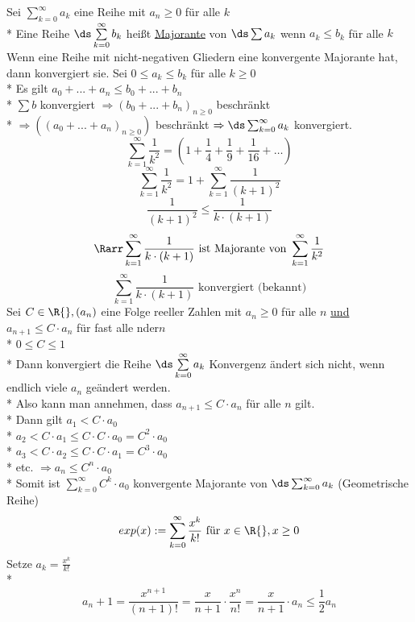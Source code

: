 \sSDef
Sei $\displaystyle\sum\limits_{k=0}^{\infty} a_k$ eine Reihe mit $a_n \geq 0$ für alle $k$\\*
Eine Reihe $\ds\sum\limits_{k=0}^{\infty} b_k$ heißt \ul{Majorante} von $\ds\sum a_k$ wenn $a_k \leq b_k$ für alle $k$
Wenn eine Reihe mit nicht-negativen Gliedern eine konvergente Majorante hat, dann konvergiert sie.
\bew
Sei $0 \leq a_k \leq b_k$ für alle $k \geq 0$\\*
Es gilt $a_0 + ... + a_n \leq b_0 + ... + b_n$ \\*
$\sum b$ konvergiert $\Rightarrow (b_0 + ... + b_n)_{n \geq 0}$  beschränkt\\*
$\Rightarrow ((a_0 + ... + a_n)_{n \geq 0})$ beschränkt $\Rightarrow \ds\sum_{k= 0}^{\infty} a_k$ konvergiert.
$$\sum\limits_{k=1}^{\infty} \frac{1}{k^2} = \left( 1 + \frac{1}{4} + \frac{1}{9}+ \frac{1}{16} + … \right)$$
$$\sum\limits_{k=1}^{\infty} \frac{1}{k^2} = 1 + \sum\limits_{k=1}^{\infty} \frac{1}{(k + 1)^2}$$
$$\frac{1}{(k + 1)^2} \leq \frac{1}{k \cdot (k + 1)}$$
$$\Rarr \sum\limits_{k=1}^{\infty} \frac{1}{k \cdot (k + 1)}\text{ ist Majorante von }\sum\limits_{k=1}^{\infty} \frac{1}{k^2}$$
$$\sum\limits_{k=1}^{\infty} \frac{1}{k \cdot (k + 1)}\text{ konvergiert (bekannt)}$$
Sei $C \in \R{}, (a_n)$ eine Folge reeller Zahlen mit $a_n \geq 0$ für alle $n$ \ul{und} $a_{n + 1} \leq C \cdot a_n$ für fast alle nder$n$\\*
$0 \leq C \leq 1$\\*
Dann konvergiert die Reihe $\ds\sum\limits_{k=0}^{\infty} a_k$
\bew
Konvergenz ändert sich nicht, wenn endlich viele $a_n$ geändert werden.\\*
Also kann man annehmen, dass $a_{n + 1} \leq C \cdot a_n$ für alle $n$ gilt.\\*
Dann gilt $a_1 < C \cdot a_0$\\*
$a_2 < C \cdot a_1 \leq C \cdot C \cdot a_0 = C^2 \cdot a_0$\\*
$a_3 < C \cdot a_2 \leq C \cdot C \cdot a_1 = C^3 \cdot a_0$\\*
etc. $\Rightarrow a_n \leq C^n \cdot a_0$\\*
Somit ist $\displaystyle\sum\limits_{k=0}^{\infty} C^k \cdot a_0$ konvergente Majorante von $\ds\sum_{k=0}^{\infty} a_k$ (Geometrische Reihe)
$$exp(x) := \sum\limits_{k=0}^{\infty} \frac{x^k}{k!} \text{ für } x \in \R{}, x \geq 0$$
Setze $a_k = \frac{x^k}{k!}$\\*
$$a_n+1 = \frac{x^{n + 1}}{(n + 1)!} = \frac{x}{n+1} \cdot \frac{x^n}{n!} = \frac{x}{n+1} \cdot a_n \leq \frac{1}{2} a_n$$

